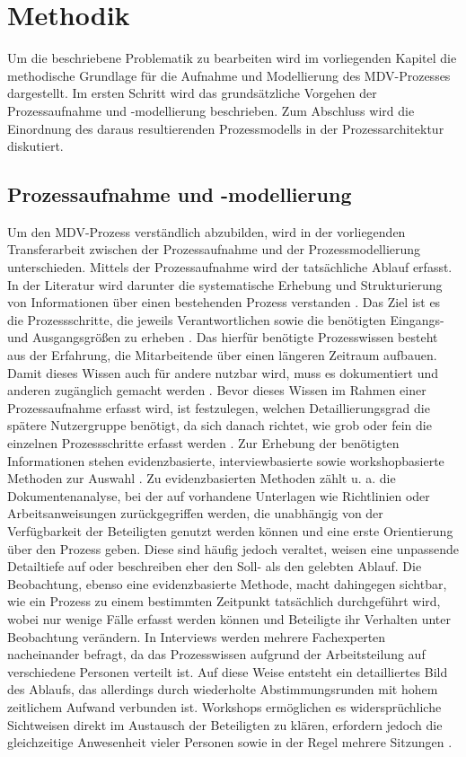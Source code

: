 \chapter{Methodik}
\label{chap:methodik}
Um die beschriebene Problematik zu bearbeiten wird im vorliegenden Kapitel die methodische Grundlage für die Aufnahme und Modellierung des MDV-Prozesses dargestellt. Im ersten Schritt wird das grundsätzliche Vorgehen der Prozessaufnahme und -modellierung beschrieben. Zum Abschluss wird die Einordnung des daraus resultierenden Prozessmodells in der Prozessarchitektur diskutiert.

\section{Prozessaufnahme und -modellierung}
\label{sec:prozessaufnahme}
Um den MDV-Prozess verständlich abzubilden, wird in der vorliegenden Transferarbeit zwischen der Prozessaufnahme und der Prozessmodellierung unterschieden. Mittels der Prozessaufnahme wird der tatsächliche Ablauf erfasst. In der Literatur wird darunter die systematische Erhebung und Strukturierung von Informationen über einen bestehenden Prozess verstanden \cite{dumas2021grundlagen}. Das Ziel ist es die Prozessschritte, die jeweils Verantwortlichen sowie die benötigten Eingangs- und Ausgangsgrößen zu erheben \cite{gadatsch2025modellierung}. Das hierfür benötigte Prozesswissen besteht aus der Erfahrung, die Mitarbeitende über einen längeren Zeitraum aufbauen. Damit dieses Wissen auch für andere nutzbar wird, muss es dokumentiert und anderen zugänglich gemacht werden \cite{Stefan2015}. 
\newline  
Bevor dieses Wissen im Rahmen einer Prozessaufnahme erfasst wird, ist festzulegen, welchen Detaillierungsgrad die spätere Nutzergruppe benötigt, da sich danach richtet, wie grob oder fein die einzelnen Prozessschritte erfasst werden \cite{gadatsch2025modellierung}. Zur Erhebung der benötigten Informationen stehen evidenzbasierte, interviewbasierte sowie workshopbasierte Methoden zur Auswahl \cite{dumas2021grundlagen}. Zu evidenzbasierten Methoden zählt u. a. die Dokumentenanalyse, bei der auf vorhandene Unterlagen wie Richtlinien oder Arbeitsanweisungen zurückgegriffen werden, die unabhängig von der Verfügbarkeit der Beteiligten genutzt werden können und eine erste Orientierung über den Prozess geben. Diese sind häufig jedoch veraltet, weisen eine unpassende Detailtiefe auf oder beschreiben eher den Soll- als den gelebten Ablauf. Die Beobachtung, ebenso eine evidenzbasierte Methode, macht dahingegen sichtbar, wie ein Prozess zu einem bestimmten Zeitpunkt tatsächlich durchgeführt wird, wobei nur wenige Fälle erfasst werden können und Beteiligte ihr Verhalten unter Beobachtung verändern. In Interviews werden mehrere Fachexperten nacheinander befragt, da das Prozesswissen aufgrund der Arbeitsteilung auf verschiedene Personen verteilt ist. Auf diese Weise entsteht ein detailliertes Bild des Ablaufs, das allerdings durch wiederholte Abstimmungsrunden mit hohem zeitlichem Aufwand verbunden ist. Workshops ermöglichen es widersprüchliche Sichtweisen direkt im Austausch der Beteiligten zu klären, erfordern jedoch die gleichzeitige Anwesenheit vieler Personen sowie in der Regel mehrere Sitzungen \cite{dumas2021grundlagen}.
